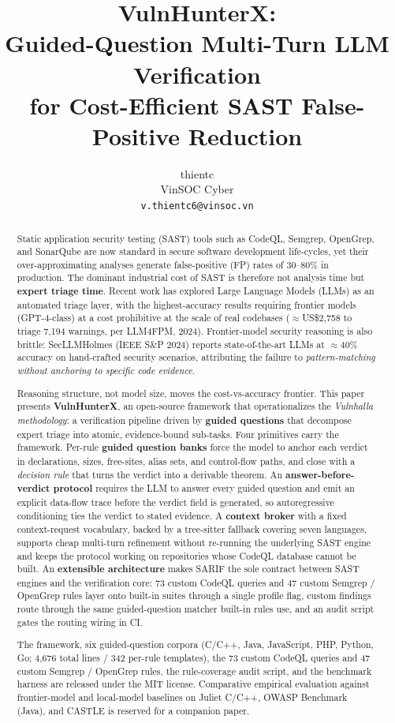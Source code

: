 \documentclass[11pt,a4paper]{article}
\title{
\textbf{VulnHunterX}: \\
Guided-Question Multi-Turn LLM Verification \\
for Cost-Efficient SAST False-Positive Reduction
}
\author{
thientc \\
VinSOC Cyber \\
\texttt{v.thientc6@vinsoc.vn}
}
\date{}
\begin{document}
\maketitle

\begin{abstract}
\noindent
Static application security testing (SAST) tools such as CodeQL,
Semgrep, OpenGrep, and SonarQube are now standard in secure software
development life-cycles, yet their over-approximating analyses generate
false-positive (FP) rates of 30--80\% in production. The dominant
industrial cost of SAST is therefore not analysis time but
\textbf{expert triage time}. Recent work has explored Large Language
Models (LLMs) as an automated triage layer, with the highest-accuracy
results requiring frontier models (GPT-4-class) at a cost prohibitive
at the scale of real codebases ($\approx$US\$2{,}758 to triage
7{,}194 warnings, per LLM4FPM, 2024). Frontier-model security reasoning
is also brittle: SecLLMHolmes (IEEE S\&P 2024) reports state-of-the-art
LLMs at $\approx$40\% accuracy on hand-crafted security scenarios,
attributing the failure to \emph{pattern-matching without anchoring to
specific code evidence}.

Reasoning structure, not model size, moves the cost-vs-accuracy
frontier. This paper presents \textbf{VulnHunterX}, an open-source
framework that operationalizes the \emph{Vulnhalla methodology}: a
verification pipeline driven by \textbf{guided questions} that
decompose expert triage into atomic, evidence-bound sub-tasks. Four
primitives carry the framework. Per-rule \textbf{guided question banks}
force the model to anchor each verdict in declarations, sizes,
free-sites, alias sets, and control-flow paths, and close with a
\emph{decision rule} that turns the verdict into a derivable theorem.
An \textbf{answer-before-verdict protocol} requires the LLM to answer
every guided question and emit an explicit data-flow trace before the
verdict field is generated, so autoregressive conditioning ties the
verdict to stated evidence. A \textbf{context broker} with a fixed
context-request vocabulary, backed by a tree-sitter fallback covering
seven languages, supports cheap multi-turn refinement without
re-running the underlying SAST engine and keeps the protocol working
on repositories whose CodeQL database cannot be built. An
\textbf{extensible architecture} makes SARIF the sole contract between
SAST engines and the verification core: 73 custom CodeQL queries and
47 custom Semgrep / OpenGrep rules layer onto built-in suites through
a single profile flag, custom findings route through the same
guided-question matcher built-in rules use, and an audit script gates
the routing wiring in CI.

The framework, six guided-question corpora (C/C++, Java, JavaScript,
PHP, Python, Go; 4{,}676 total lines / 342 per-rule templates), the
73 custom CodeQL queries and 47 custom Semgrep / OpenGrep rules, the
rule-coverage audit script, and the benchmark harness are released
under the MIT license. Comparative empirical evaluation against
frontier-model and local-model baselines on Juliet C/C++, OWASP
Benchmark (Java), and CASTLE is reserved for a companion paper.
\end{abstract}
\end{document}
